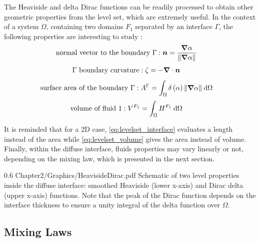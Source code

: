The Heaviside and delta Dirac functions can be readily processed to obtain other geometric properties from the level set,
which are extremely useful. In the context of a system $\Omega$, containing two domains $F_1$ separated by an interface $\Gamma$, 
the following properties are interesting to study \citep{peng_pde-based_1999}:
\begin{align}
\label{eq:levelset_normal}
\text{normal vector to the boundary }\Gamma: \boldsymbol{n} &= \frac{\boldsymbol{\nabla} \alpha}{\lVert \boldsymbol{\nabla} \alpha \rVert }
\end{align}
%
\begin{align}
\label{eq:levelset_curvature}
\Gamma \text{ boundary curvature}: \zeta &= - \boldsymbol{\nabla} \cdot \boldsymbol{n}
\end{align}
%
\begin{align}
\label{eq:levelset_interface}
\text{surface area of the boundary }\Gamma: A^\Gamma &= \int_{\Omega} \delta \left( \alpha \right) \lVert \boldsymbol{\nabla} \alpha \rVert\: \mathrm{d}\Omega
\end{align}
%
\begin{align}
\label{eq:levelset_volume}
\text{volume of fluid 1}: V^{F_1} &= \int_{\Omega} H^{F_1}\: \mathrm{d}\Omega
\end{align}

It is reminded that for a 2D case, \cref{eq:levelset_interface} evaluates a length 
instead of the area while \cref{eq:levelset_volume} gives the area instead of volume.
Finally, within the diffuse interface, fluids properties 
may vary linearly or not, depending on the mixing law, which is presented in the next section.
\begin{figureth}
{0.6}
{Chapter2/Graphics/HeavisideDirac.pdf}
{Schematic of two level properties inside the diffuse interface: smoothed Heaviside (lower x-axis) and Dirac delta (upper x-axis) functions.
Note that the peak of the Dirac function depends on the interface thickness to ensure a unity integral of the delta function over $\Omega$. }
\label{fig:heaviside_dirac}
\end{figureth}

\subsection{Mixing Laws} \label{sec:mixinglaws}

